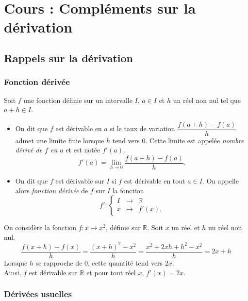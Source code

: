\documentclass[11pt,fleqn, openany]{book} %
\begin{document}
\chapter{Cours : Compléments sur la dérivation}

\section{Rappels sur la dérivation}

\subsection{Fonction dérivée}

\begin{definition}Soit $f$ une fonction définie sur un intervalle $I$, $a\in I$ et $h$ un réel non nul tel que $a+h \in I$. 

\begin{itemize}
\item On dit que $f$ est dérivable en $a$ si le taux de variation $\dfrac{f(a+h)-f(a)}{h}$ admet une limite finie lorsque $h$ tend vers 0. Cette limite est appelée \textit{nombre dérivé de $f$ en $a$ }et est notée $f'(a)$.
\[ f'(a)=\lim_{h \to 0} \dfrac{f(a+h)-f(a)}{h}. \]
\item On dit que $f$ est dérivable sur $I$ si $f$ est dérivable en tout $a\in I$. On appelle alors \textit{fonction dérivée} de $f$ sur $I$ la fonction
\[f' : \left\{ \begin{array}{rcl}
I & \longrightarrow & \mathbb{R}\\
x & \longmapsto & f'(x).
\end{array}\right.\]\end{itemize}\end{definition}

\begin{example}On considère la fonction $f : x \mapsto x^2$, définie sur $\mathbb{R}$. Soit $x$ un réel et $h$ un réel non nul.
\[ \dfrac{f(x+h)-f(x)}{h}=\dfrac{(x+h)^2-x^2}{h}=\dfrac{x^2+2xh+h^2-x^2}{h}=2x+h\]
Lorsque $h$ se rapproche de 0, cette quantité tend vers $2x$. \\Ainsi, $f$ est dérivable sur $\mathbb{R}$ et pour tout réel $x$, $f'(x)=2x$.\end{example}

\subsection{Dérivées usuelles}
\end{document}
